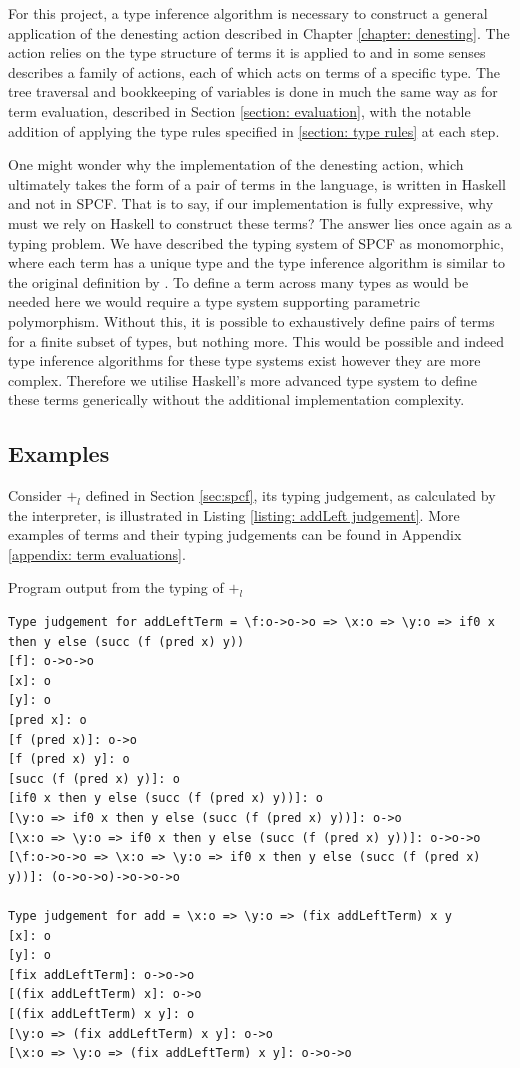 \documentclass[12pt,a4paper]{report}
\theoremstyle{definition}
\theoremstyle{definition}
\theoremstyle{remark}
\begin{document}
For this project, a type inference algorithm is necessary to construct a general application of the denesting action described in Chapter \ref{chapter: denesting}. The action relies on the type structure of terms it is applied to and in some senses describes a family of actions, each of which acts on terms of a specific type. The tree traversal and bookkeeping of variables is done in much the same way as for term evaluation, described in Section \ref{section: evaluation}, with the notable addition of applying the type rules specified in \ref{section: type rules} at each step.

One might wonder why the implementation of the denesting action, which ultimately takes the form of a pair of terms in the language, is written in Haskell and not in SPCF. That is to say, if our implementation is fully expressive, why must we rely on Haskell to construct these terms? The answer lies once again as a typing problem. We have described the typing system of SPCF as monomorphic, where each term has a unique type and the type inference algorithm is similar to the original definition by \cite{curry1958combinatory}. To define a term across many types as would be needed here we would require a type system supporting parametric polymorphism. Without this, it is possible to exhaustively define pairs of terms for a finite subset of types, but nothing more. This would be possible and indeed type inference algorithms for these type systems exist \cite[\emph{e.g.},][]{hindley_1969, milner_1978} however they are more complex. Therefore we utilise Haskell's more advanced type system to define these terms generically without the additional implementation complexity. 

\subsection{Examples}
Consider $+_l$ defined in Section \ref{sec:spcf}, its typing judgement, as calculated by the interpreter, is illustrated in Listing \ref{listing: addLeft judgement}. More examples of terms and their typing judgements can be found in Appendix \ref{appendix: term evaluations}.
\begin{listing}
\caption{Program output from the typing of $+_l$}
\label{listing: addLeft judgement}
\begin{verbatim}
Type judgement for addLeftTerm = \f:o->o->o => \x:o => \y:o => if0 x then y else (succ (f (pred x) y))
[f]: o->o->o
[x]: o
[y]: o
[pred x]: o
[f (pred x)]: o->o
[f (pred x) y]: o
[succ (f (pred x) y)]: o
[if0 x then y else (succ (f (pred x) y))]: o
[\y:o => if0 x then y else (succ (f (pred x) y))]: o->o
[\x:o => \y:o => if0 x then y else (succ (f (pred x) y))]: o->o->o
[\f:o->o->o => \x:o => \y:o => if0 x then y else (succ (f (pred x) y))]: (o->o->o)->o->o->o

Type judgement for add = \x:o => \y:o => (fix addLeftTerm) x y
[x]: o
[y]: o
[fix addLeftTerm]: o->o->o
[(fix addLeftTerm) x]: o->o
[(fix addLeftTerm) x y]: o
[\y:o => (fix addLeftTerm) x y]: o->o
[\x:o => \y:o => (fix addLeftTerm) x y]: o->o->o
\end{verbatim}
\end{listing}
\end{document}
